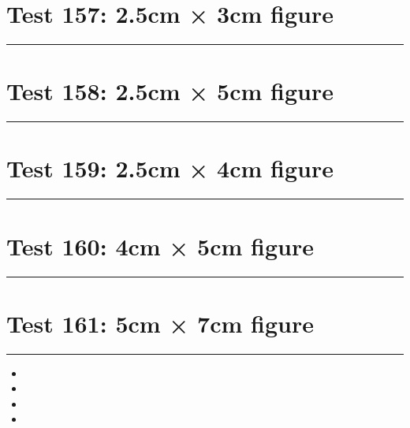 \documentclass[a4paper,11pt]{article}
\begin{document}
\section*{Test 157: 2.5cm × 3cm figure}
\begin{swarmwrap}%
  \begin{minipage}[t]{2cm}
    \centering
    \rule{\linewidth}{3cm}
  \end{minipage}%
\end{swarmwrap}%
\swarmwrapnext
\lipsum[9]
\lipsum[10]
\lipsum[11]
\section*{Test 158: 2.5cm × 5cm figure}
\begin{swarmwrap}%
  \begin{minipage}[t]{2cm}
    \centering
    \rule{\linewidth}{5cm}
  \end{minipage}%
\end{swarmwrap}%
\swarmwrapnext
\lipsum[41]
\lipsum[42]
\lipsum[43]
\section*{Test 159: 2.5cm × 4cm figure}
\begin{swarmwrap}%
  \begin{minipage}[t]{2cm}
    \centering
    \rule{\linewidth}{4cm}
  \end{minipage}%
\end{swarmwrap}%
\swarmwrapnext
\lipsum[31]
\lipsum[32]
\lipsum[33]
\lipsum[34]
\lipsum[35]
\lipsum[36]
\section*{Test 160: 4cm × 5cm figure}
\begin{swarmwrap}%
  \begin{minipage}[t]{4cm}
    \centering
    \rule{\linewidth}{5cm}
  \end{minipage}%
\end{swarmwrap}%
\swarmwrapnext
\lipsum[67]
\lipsum[68]
\lipsum[69]
\lipsum[70]
\lipsum[71]
\lipsum[72]
\section*{Test 161: 5cm × 7cm figure}
\begin{swarmwrap}%
  \begin{minipage}[t]{5cm}
    \centering
    \rule{\linewidth}{7cm}
  \end{minipage}%
\end{swarmwrap}%
\swarmwrapnext
\lipsum[30]
\begin{itemize}
  \item \lipsum[31][1-3]
  \item \lipsum[32][1-3]
  \item \lipsum[33][1-3]
  \item \lipsum[34][1-3]
\end{itemize}
\end{document}
